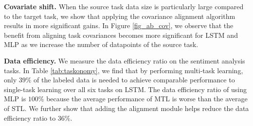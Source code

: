 \textbf{Covariate shift.}
When the source task data size is particularly large compared to the target task, we show that applying the covariance alignment algorithm results in more significant gains.
In Figure \ref{fig_ab_cov}, we observe that the benefit from aligning task covariances becomes more significant for LSTM and MLP as we increase the number of datapoints of the source task.

\textbf{Data efficiency.}
We measure the data efficiency ratio on the sentiment analysis tasks.
In Table \ref{tab:taskonomy}, we find that by performing multi-task learning, only $39\%$ of the labeled data is needed to achieve comparable performance to single-task learning over all six tasks on LSTM.
The data efficiency ratio of using MLP is $100\%$ because the average performance of MTL is worse than the average of STL.
We further show that adding the alignment module helps reduce the data efficiency ratio to $36\%$.



